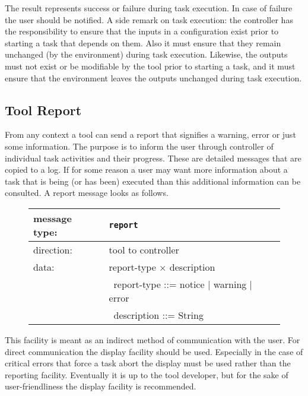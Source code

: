 \documentclass{article}
\newcommand{\msg}[1]{\texttt{#1}}
\begin{document}
   \noindent The result represents success or failure during task execution. In
   case of failure the user should be notified. A side remark on task
   execution: the controller has the responsibility to ensure that the inputs
   in a configuration exist prior to starting a task that depends on them. Also
   it must ensure that they remain unchanged (by the environment) during task
   execution. Likewise, the outputs must not exist or be modifiable by the tool
   prior to starting a task, and it must ensure that the environment leaves the
   outputs unchanged during task execution.

  \subsection{Tool Report}

   From any context a tool can send a report that signifies a warning, error or
   just some information. The purpose is to inform the user through controller
   of individual task activities and their progress. These are detailed
   messages that are copied to a log. If for some reason a user may want more
   information about a task that is being (or has been) executed than this
   additional information can be consulted. A report message looks as follows.
   
   \begin{figure}[H]
    \begin{center}
     \begin{tabular}{|ll|}
      \hline
       message type:   & \msg{report} \\
      \hline
       direction:      & tool to controller \\
       data:           & report-type $\times$ description \\
                       & \ report-type ::= notice $|$ warning $|$ error \\
                       & \ description ::= String \\
      \hline
     \end{tabular}
    \end{center}
   \end{figure}
   \vspace{-0.3cm}

   \noindent This facility is meant as an indirect method of communication with
   the user.  For direct communication the display facility should be used.
   Especially in the case of critical errors that force a task abort the
   display must be used rather than the reporting facility. Eventually it is up
   to the tool developer, but for the sake of user-friendliness the display
   facility is recommended.
\end{document}
